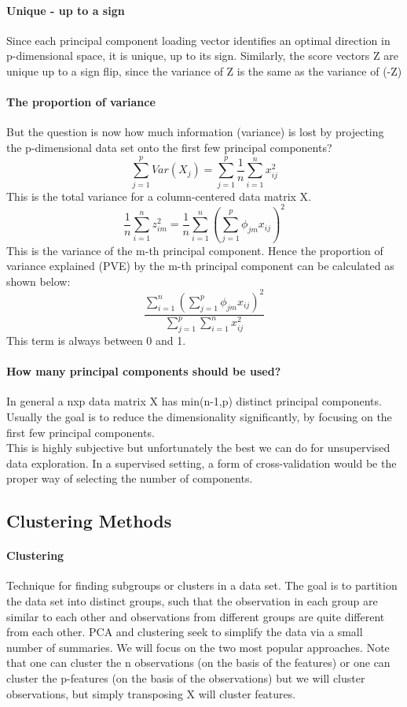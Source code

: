 \documentclass[../document.tex]{subfiles}
\begin{document}
	\paragraph{Unique - up to a sign}
	Since each principal component loading vector identifies an optimal direction in p-dimensional space, it is unique, up to its sign. Similarly, the score vectors Z are unique up to a sign flip, since the variance of Z is the same as the variance of (-Z)
	\paragraph{The proportion of variance}
	But the question is now how much information (variance) is lost by projecting the p-dimensional data set onto the first few principal components? 
	\begin{equation}
		\sum_{j=1}^{p}Var(X_{j})=\sum_{j=1}^{p}\frac{1}{n}\sum_{i=1}^{n}x_{ij}^2
	\end{equation}
	This is the total variance for a column-centered data matrix X.
	\begin{equation}
		\frac{1}{n}\sum_{i=1}^{n}z_{im}^2=\frac{1}{n}\sum_{i=1}^{n}(\sum_{j=1}^{p}\phi_{jm}x_{ij})^2
	\end{equation}
	This is the variance of the m-th principal component. Hence the proportion of variance explained (PVE) by the m-th principal component can be calculated as shown below:
	\begin{equation}
		\frac{\sum_{i=1}^{n}(\sum_{j=1}^{p}\phi_{jm}x_{ij})^2}{\sum_{j=1}^{p}\sum_{i=1}^{n}x_{ij}^2}
	\end{equation}
	This term is always between 0 and 1.
	\paragraph{How many principal components should be used?}
	In general a nxp data matrix X has min(n-1,p) distinct principal components. Usually the goal is to reduce the dimensionality significantly, by focusing on the first few principal components.\\
	This is highly subjective but unfortunately the best we can do for unsupervised data exploration. In a supervised setting, a form of cross-validation would be the proper way of selecting the number of components. 
	\subsection{Clustering Methods}
	\paragraph{Clustering}
	Technique for finding subgroups or clusters in a data set. The goal is to partition the data set into distinct groups, such that the observation in each group are similar to each other and observations from different groups are quite different from each other. PCA and clustering seek to simplify the data via a small number of summaries. We will focus on the two most popular approaches. Note that one can cluster the n observations (on the basis of the features) or one can cluster the p-features (on the basis of the observations) but we will cluster observations, but simply transposing X will cluster features. 
\end{document}
